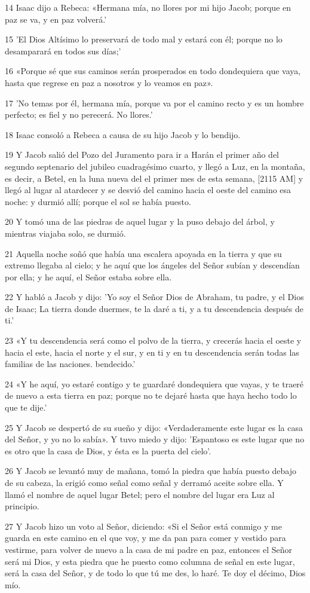 \par 14 Isaac dijo a Rebeca: «Hermana mía, no llores por mi hijo Jacob; porque en paz se va, y en paz volverá.'
\par 15 'El Dios Altísimo lo preservará de todo mal y estará con él; porque no lo desamparará en todos sus días;'
\par 16 «Porque sé que sus caminos serán prosperados en todo dondequiera que vaya, hasta que regrese en paz a nosotros y lo veamos en paz».
\par 17 'No temas por él, hermana mía, porque va por el camino recto y es un hombre perfecto; es fiel y no perecerá. No llores.'
\par 18 Isaac consoló a Rebeca a causa de su hijo Jacob y lo bendijo.
\par 19 Y Jacob salió del Pozo del Juramento para ir a Harán el primer año del segundo septenario del jubileo cuadragésimo cuarto, y llegó a Luz, en la montaña, es decir, a Betel, en la luna nueva del el primer mes de esta semana, [2115 AM] y llegó al lugar al atardecer y se desvió del camino hacia el oeste del camino esa noche: y durmió allí; porque el sol se había puesto.
\par 20 Y tomó una de las piedras de aquel lugar y la puso debajo del árbol, y mientras viajaba solo, se durmió.
\par 21 Aquella noche soñó que había una escalera apoyada en la tierra y que su extremo llegaba al cielo; y he aquí que los ángeles del Señor subían y descendían por ella; y he aquí, el Señor estaba sobre ella.
\par 22 Y habló a Jacob y dijo: 'Yo soy el Señor Dios de Abraham, tu padre, y el Dios de Isaac; La tierra donde duermes, te la daré a ti, y a tu descendencia después de ti.'
\par 23 «Y tu descendencia será como el polvo de la tierra, y crecerás hacia el oeste y hacia el este, hacia el norte y el sur, y en ti y en tu descendencia serán todas las familias de las naciones. bendecido.'
\par 24 «Y he aquí, yo estaré contigo y te guardaré dondequiera que vayas, y te traeré de nuevo a esta tierra en paz; porque no te dejaré hasta que haya hecho todo lo que te dije.'
\par 25 Y Jacob se despertó de su sueño y dijo: «Verdaderamente este lugar es la casa del Señor, y yo no lo sabía». Y tuvo miedo y dijo: 'Espantoso es este lugar que no es otro que la casa de Dios, y ésta es la puerta del cielo'.
\par 26 Y Jacob se levantó muy de mañana, tomó la piedra que había puesto debajo de su cabeza, la erigió como señal como señal y derramó aceite sobre ella. Y llamó el nombre de aquel lugar Betel; pero el nombre del lugar era Luz al principio.
\par 27 Y Jacob hizo un voto al Señor, diciendo: «Si el Señor está conmigo y me guarda en este camino en el que voy, y me da pan para comer y vestido para vestirme, para volver de nuevo a la casa de mi padre en paz, entonces el Señor será mi Dios, y esta piedra que he puesto como columna de señal en este lugar, será la casa del Señor, y de todo lo que tú me des, lo haré. Te doy el décimo, Dios mío.

